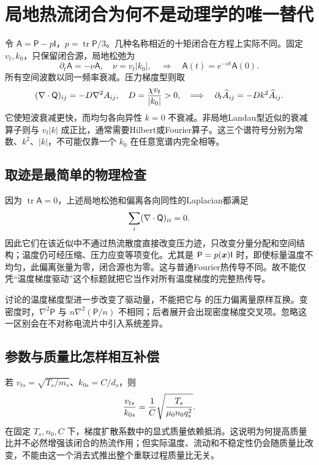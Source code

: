 \section{局地热流闭合为何不是动理学的唯一替代}
令 $\mathsf A=\mathsf P-p\mathsf I$，$p=\operatorname{tr}\mathsf P/3$。几种名称相近的十矩闭合在方程上实际不同。固定 $v_t,k_0$，只保留闭合源，局地松弛为
\begin{equation}
\partial_t\mathsf A=-\nu\mathsf A,\quad \nu=v_t|k_0|,
\quad\Longrightarrow\quad\mathsf A(t)=e^{-\nu t}\mathsf A(0).
\end{equation}
所有空间波数以同一频率衰减。压力梯度型则取
\begin{equation}
(\nabla\cdot\mathsf Q)_{ij}=-D\nabla^2 A_{ij},\quad
D={\chi v_t\over |k_0|}>0,
\quad\Longrightarrow\quad
\partial_t\widehat A_{ij}=-Dk^2\widehat A_{ij}.
\end{equation}
它使短波衰减更快，而均匀各向异性 $k=0$ 不衰减。非局地Landau型近似的衰减算子则与 $v_t|k|$ 成正比，通常需要Hilbert或Fourier算子。这三个谱符号分别为常数、$k^2$、$|k|$，不可能仅靠一个 $k_0$ 在任意宽谱内完全相等。\citep{Wang2015,Ng2017,L256,E552}

\subsection{取迹是最简单的物理检查}
因为 $\operatorname{tr}\mathsf A=0$，上述局地松弛和偏离各向同性的Laplacian都满足
\begin{equation}\sum_i(\nabla\cdot\mathsf Q)_{ii}=0.
\end{equation}
因此它们在该近似中不通过热流散度直接改变压力迹，只改变分量分配和空间结构；温度仍可经压缩、压力应变等项变化。尤其是 $\mathsf P=p(\bm{x})\mathsf I$ 时，即使标量温度不均匀，此偏离张量为零，闭合源也为零。这与普通Fourier热传导不同。故不能仅凭“温度梯度驱动”这个标题就把它当作对所有温度梯度的完整热传导。

\citet{Ng2020}讨论的温度梯度型进一步改变了驱动量，不能把它与 \citet{L256,E552} 的压力偏离量原样互换。变密度时，$\nabla^2\mathsf P$ 与 $n\nabla^2(\mathsf P/n)$ 不相同；后者展开会出现密度梯度交叉项。忽略这一区别会在不对称电流片中引入系统差异。

\subsection{参数与质量比怎样相互补偿}
若 $v_{ts}=\sqrt{T_s/m_s}$、$k_{0s}=C/d_s$，则
\begin{equation}
{v_{ts}\over k_{0s}}={1\over C}\sqrt{T_s\over\mu_0n_0q_s^2}.
\end{equation}
在固定 $T_s,n_0,C$ 下，梯度扩散系数中的显式质量依赖抵消。这说明为何提高质量比并不必然增强该闭合的热流作用；但实际温度、流动和不稳定性仍会随质量比改变，不能由这一个消去式推出整个重联过程质量比无关。

